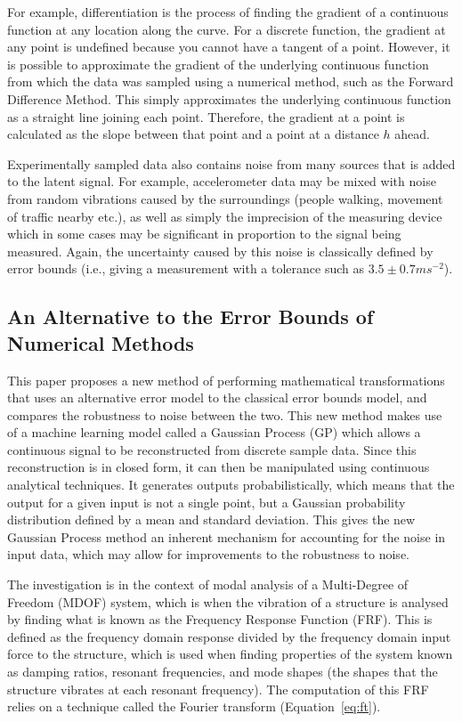 \documentclass[12pt]{article}
\begin{document}
    For example, differentiation is the process of finding the gradient of a continuous function at any location along the curve.
    For a discrete function, the gradient at any point is undefined because you cannot have a tangent of a point.
    However, it is possible to approximate the gradient of the underlying continuous function from which the data was sampled using a numerical method, such as the Forward Difference Method.
    This simply approximates the underlying continuous function as a straight line joining each point.
    Therefore, the gradient at a point is calculated as the slope between that point and a point at a distance $h$ ahead.

    Experimentally sampled data also contains noise from many sources that is added to the latent signal.
    For example, accelerometer data may be mixed with noise from random vibrations caused by the surroundings (people walking, movement of traffic nearby etc.), as well as simply the imprecision of the measuring device which in some cases may be significant in proportion to the signal being measured.
    Again, the uncertainty caused by this noise is classically defined by error bounds (i.e., giving a measurement with a tolerance such as $3.5 \pm 0.7 ms^{-2}$).

    \subsection{An Alternative to the Error Bounds of Numerical Methods}

    This paper proposes a new method of performing mathematical transformations that uses an alternative error model to the classical error bounds model, and compares the robustness to noise between the two.
    This new method makes use of a machine learning model called a Gaussian Process (GP) which allows a continuous signal to be reconstructed from discrete sample data.
    Since this reconstruction is in closed form, it can then be manipulated using continuous analytical techniques.
    It generates outputs probabilistically, which means that the output for a given input is not a single point, but a Gaussian probability distribution defined by a mean and standard deviation.
    This gives the new Gaussian Process method an inherent mechanism for accounting for the noise in input data, which may allow for improvements to the robustness to noise.

    The investigation is in the context of modal analysis of a Multi-Degree of Freedom (MDOF) system, which is when the vibration of a structure is analysed by finding what is known as the Frequency Response Function (FRF). This is defined as the frequency domain response divided by the frequency domain input force to the structure, which is used when finding properties of the system known as damping ratios, resonant frequencies, and mode shapes (the shapes that the structure vibrates at each resonant frequency).
    The computation of this FRF relies on a technique called the Fourier transform (Equation~\ref{eq:ft}).
\end{document}
